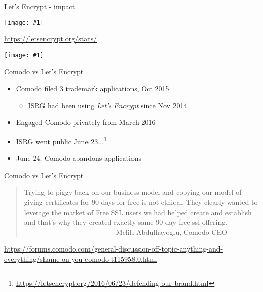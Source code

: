 \documentclass[ignorenonframetext,aspectratio=169]{beamer}
\makeatletter
\def\maxwidth{\ifdim\Gin@nat@width>\linewidth\linewidth\else\Gin@nat@width\fi}
\def\maxheight{\ifdim\Gin@nat@height>\textheight0.8\textheight\else\Gin@nat@height\fi}
\newcommand{\includegraphicsscaled}[1]{
    \texttt{[image: \#1]}
}
\makeatother
\begin{document}
\begin{frame}{Let's Encrypt - impact}

\begin{center}
\includegraphicsscaled{https-pageloads.png}
\end{center}

\tiny

\url{https://letsencrypt.org/stats/}

\end{frame}

\begin{frame}[plain]

\begin{center}
\includegraphicsscaled{comodo-lets-encrypt.png}
\end{center}

\end{frame}

\begin{frame}{Comodo vs Let's Encrypt}

\begin{itemize}

\item<+-> Comodo filed 3 trademark applications, Oct 2015

  \begin{itemize}
  \item  ISRG had been using {\em Let's Encrypt} since Nov 2014
  \end{itemize}

\item  Engaged Comodo privately from March 2016

\item  ISRG went public
  June 23...\footnote{\url{https://letsencrypt.org/2016/06/23/defending-our-brand.html}}

\item<+->  June 24: Comodo abandons applications

\end{itemize}

\end{frame}

\begin{frame}{Comodo vs Let's Encrypt}
\large
\begin{quote}
  Trying to piggy back on our business model and copying our model
  of giving certificates for 90 days for free is not ethical. They
  clearly wanted to leverage the market of Free SSL users we had
  helped create and establish and that's why they created exactly
  same 90 day free ssl offering.\\
  ~~~~~~~~~~~~~~~~~~~~~~~~---Melih Abdulhayoglu, Comodo CEO
\end{quote}

\bigskip

\tiny

\url{https://forums.comodo.com/general-discussion-off-topic-anything-and-everything/shame-on-you-comodo-t115958.0.html}

\end{frame}
\end{document}
